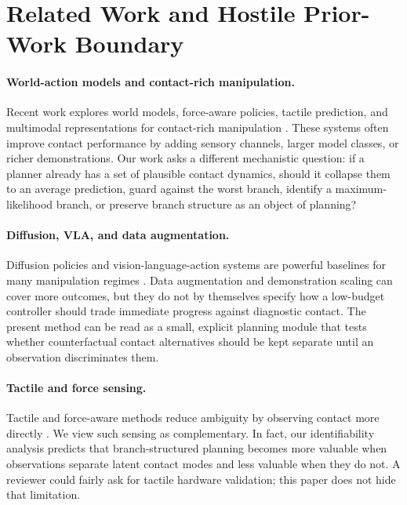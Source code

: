 \documentclass{article}
\begin{document}
\section{Related Work and Hostile Prior-Work Boundary}

\paragraph{World-action models and contact-rich manipulation.}
Recent work explores world models, force-aware policies, tactile prediction, and multimodal representations for contact-rich manipulation \citep{omniVTA2026,dreamTacVLA2025,forceVLA2025,tacforesight2026,fawam2026}.  These systems often improve contact performance by adding sensory channels, larger model classes, or richer demonstrations.  Our work asks a different mechanistic question: if a planner already has a set of plausible contact dynamics, should it collapse them to an average prediction, guard against the worst branch, identify a maximum-likelihood branch, or preserve branch structure as an object of planning?

\paragraph{Diffusion, VLA, and data augmentation.}
Diffusion policies and vision-language-action systems are powerful baselines for many manipulation regimes \citep{planningGuidedDiffusion2024,diffusionVLA2026,forceVLA2025}.  Data augmentation and demonstration scaling can cover more outcomes, but they do not by themselves specify how a low-budget controller should trade immediate progress against diagnostic contact.  The present method can be read as a small, explicit planning module that tests whether counterfactual contact alternatives should be kept separate until an observation discriminates them.

\paragraph{Tactile and force sensing.}
Tactile and force-aware methods reduce ambiguity by observing contact more directly \citep{dexvitac2026,tactileSkins2024,tacforesight2026}.  We view such sensing as complementary.  In fact, our identifiability analysis predicts that branch-structured planning becomes more valuable when observations separate latent contact modes and less valuable when they do not.  A reviewer could fairly ask for tactile hardware validation; this paper does not hide that limitation.
\end{document}
